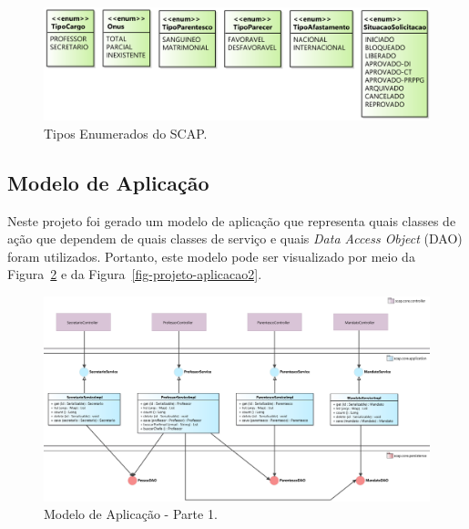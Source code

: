 \begin{figure}[!h]
	\centering
	\includegraphics[scale=0.3]{figuras/fig-projeto-enum} 
	\caption{Tipos Enumerados do SCAP.}
	\label{fig-projeto-enum}
\end{figure}

\subsection{Modelo de Aplicação}
\label{sec-projeto-modelo-aplicacao}

Neste projeto foi gerado um modelo de aplicação que representa quais classes de ação que dependem de quais classes de serviço e quais \textit{Data Access Object} (DAO) foram utilizados. Portanto, este modelo pode ser visualizado por meio da Figura~\ref{fig-projeto-aplicacao1} e da Figura~\ref{fig-projeto-aplicacao2}. 

\begin{figure}[!h]
	\centering
	\includegraphics[width=1\textwidth]{figuras/fig-projeto-aplicacao1.png}
	\caption{Modelo de Aplicação - Parte 1.}
	\label{fig-projeto-aplicacao1}
\end{figure}

